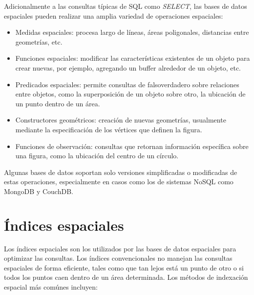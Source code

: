 \documentclass{article}
\begin{document}
Adicionalmente a las consultas t\'ipicas de SQL como \emph{SELECT}, las bases de datos espaciales pueden realizar una amplia variedad de operaciones espaciales:

\begin{itemize}
  \item Medidas espaciales: procesa largo de l\'ineas, \'areas poligonales, distancias entre geometr\'ias, etc.
  \item Funciones espaciales: modificar las caracter\'isticas existentes de un objeto para crear nuevas, por ejemplo, agregando un buffer alrededor de un objeto, etc.
  \item Predicados espaciales: permite consultas de falso\/verdadero sobre relaciones entre objetos, como la superposici\'on de un objeto sobre otro, la ubicaci\'on de un punto dentro de un \'area.
  \item Constructores geom\'etricos: creaci\'on de nuevas geometr\'ias, usualmente mediante la especificaci\'on de los v\'ertices que definen la figura.
  \item Funciones de observaci\'on: consultas que retornan informaci\'on espec\'ifica sobre una figura, como la ubicaci\'on del centro de un c\'irculo.
\end{itemize}

Algunas bases de datos soportan solo versiones simplificadas o modificadas de estas operaciones, especialmente en casos como los de sistemas NoSQL como MongoDB y CouchDB.

\section{\'Indices espaciales}
Los \'indices espaciales son los utilizados por las bases de datos espaciales para optimizar las consultas. Los \'indices convencionales no manejan las consultas espaciales de forma eficiente, tales como que tan lejos est\'a un punto de otro o si todos los puntos caen dentro de un \'area determinada. Los m\'etodos de indexaci\'on espacial m\'as com\'unes incluyen:
\end{document}
